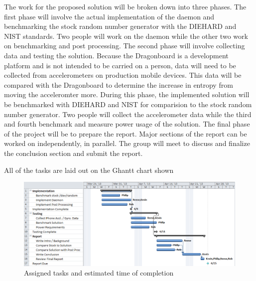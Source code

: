 
The work for the proposed solution will be broken down into three phases.  The first phase will involve the actual implementation of the daemon and benchmarking the stock random number generator with the DIEHARD and NIST standards.  Two people will work on the daemon while the other two work on benchmarking and post processing.  The second phase will involve collecting data and testing the solution.  Because the Dragonboard is a development platform and is not intended to be carried on a person, data will need to be collected from accelerometers on production mobile devices.  This data will be compared with the Dragonboard to determine the increase in entropy from moving the acceleromter more.  During this phase, the implemented solution will be benchmarked with DIEHARD and NIST for comparision to the stock random number generator.  Two people will collect the accelerometer data while the third and fourth benchmark and measure power usage of the solution.  The final phase of the project will be to prepare the report.  Major sections of the report can be worked on independently, in parallel.  The group will meet to discuss and finalize the conclusion section and submit the report.  

All of the tasks are laid out on the Ghantt chart shown

\begin{figure}[t]
	\includegraphics[width=\columnwidth]{proj-ghantt-v3}
	\caption{Assigned tasks and estimated time of completion}
	\label{Ghantt Chart}
\end{figure}